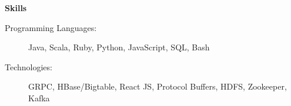 \documentclass[letterpaper,11pt]{article}
\newcommand{\resheading}[1]{{\large \colorbox{mygrey}{\begin{minipage}{\textwidth}{\textbf{#1 \vphantom{p\^{E}}}}\end{minipage}}}}
\begin{document}
\resheading{Skills}
\begin{description}
	\item[Programming Languages:] { \footnotesize
	      Java, Scala, Ruby, Python, JavaScript, SQL, Bash
	}
	\item[Technologies:] { \footnotesize
	      GRPC, HBase/Bigtable, React JS, Protocol Buffers, HDFS, Zookeeper, Kafka
	}
\end{description} %

\end{document}
